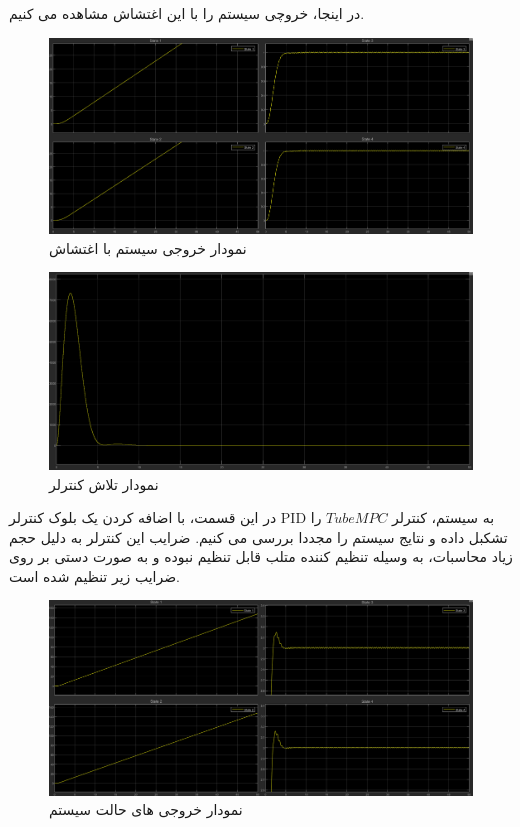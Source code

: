 در اینجا، خروچی سیستم را با این اغتشاش مشاهده می کنیم.
\begin{figure}[H]
	\centering
	\includegraphics[width=1\linewidth]{../img/Q3_High_disturbance}
	\caption{نمودار خروجی سیستم با اغتشاش}
	\label{fig:q3highdisturbance}
\end{figure}
\begin{figure}[H]
	\centering
	\includegraphics[width=1\linewidth]{../img/Q3_High_disturbance_Ceffort}
	\caption{نمودار تلاش کنترلر}
	\label{fig:q3highdisturbanceceffort}
\end{figure}
در این قسمت، با اضافه کردن یک بلوک کنترلر PID به سیستم، کنترلر $Tube MPC$ را تشکبل داده و نتایج سیستم را مجددا بررسی می کنیم.
ضرایب این کنترلر به دلیل حجم زیاد محاسبات، به وسیله تنظیم کننده متلب قابل تنظیم نبوده و به صورت دستی بر روی ضرایب زیر تنظیم شده است.
\begin{figure}[H]
	\centering
	\includegraphics[width=1\linewidth]{../img/Q3_High_disturbance_Tube_Response}
	\caption{نمودار خروجی های حالت سیستم}
	\label{fig:q3highdisturbancetuberesponse}
\end{figure}
